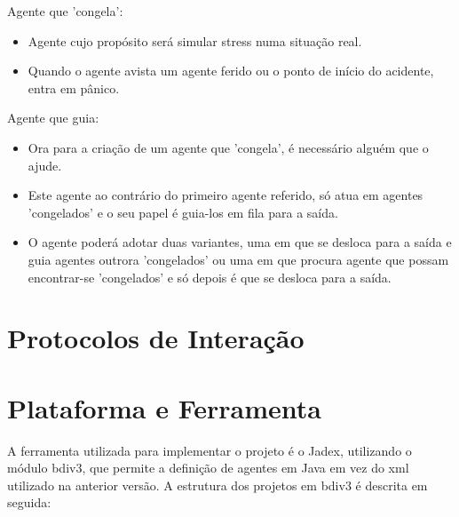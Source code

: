 \documentclass[a4paper,11pt]{article}
\begin{document}
Agente que 'congela':
\begin{itemize}
\item Agente cujo propósito será simular stress numa situação real. 
\item Quando o agente avista um agente ferido ou o ponto de início do acidente, entra em pânico. 
\\
\end{itemize}

Agente que guia:
\begin{itemize}
\item Ora para a criação de um agente que 'congela', é necessário alguém que o ajude.
\item Este agente ao contrário do primeiro agente referido, só atua em agentes 'congelados' e o seu papel é guia-los em fila para a saída.
\item O agente poderá adotar duas variantes, uma em que se desloca para a saída e guia agentes outrora 'congelados' ou uma em que procura agente que possam encontrar-se 'congelados' e só depois é que se desloca para a saída.
\end{itemize}

\section{Protocolos de Interação}

\section{Plataforma e Ferramenta}  
A ferramenta utilizada para implementar o projeto é o Jadex, utilizando o módulo bdiv3, que permite a definição de agentes em Java em vez do xml utilizado na anterior versão.
A estrutura dos projetos em bdiv3 é descrita em seguida:

\DTsetlength{.2em}{1.5em}{.4em}{.4pt}{3pt}

\end{document}
